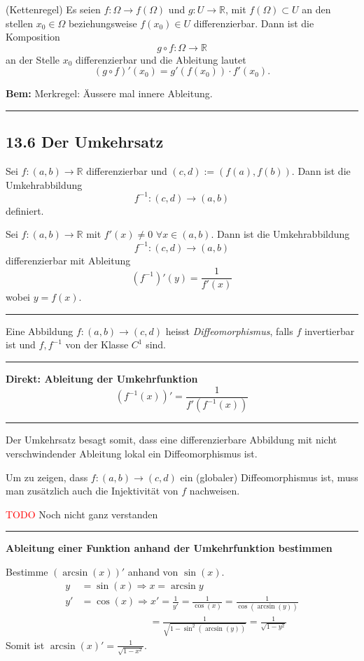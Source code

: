 \documentclass[a4paper,landscape,8pt]{extarticle}
\newcommand{\R}{\mathbb{R}}
\newcommand{\todo}{\textcolor{red}{TODO }}
\newcommand{\sep}{\vspace{5pt}\noindent\hrule\vspace{5pt}}
\newcommand{\Bem}{\textbf{Bem: }}
\begin{document}
\begin{multicols*}{4}
\Satz (Kettenregel) Es seien $f\colon\Omega\to f(\Omega)$ und $g\colon
U\to\R$, mit $f(\Omega) \subset U$ an den stellen $x_0\in \Omega$
beziehungsweise $f(x_0)\in U$ differenzierbar. Dann ist die Komposition
\[
g\circ f \colon \Omega \to \R
\]
an der Stelle $x_0$ differenzierbar und die Ableitung lautet
\[
(g\circ f)'(x_0) = g'(f(x_0))\cdot f'(x_0).
\]

\Bem Merkregel: Äussere mal innere Ableitung.

\sep

\subsection{13.6 Der Umkehrsatz}

Sei $f\colon (a,b)\to\R$ differenzierbar und $(c,d):=(f(a),f(b))$. Dann ist die
Umkehrabbildung
\[
f^{-1}\colon (c,d) \to (a,b)
\]
definiert.

\Satz Sei $f\colon (a,b)\to \R$ mit $f'(x)\neq 0$ $\forall x \in (a,b)$. Dann
ist die Umkehrabbildung
\[
f^{-1}\colon (c,d)\to (a,b)
\]
differenzierbar mit Ableitung
\[
(f^{-1})'(y)=\frac{1}{f'(x)}
\]
wobei $y=f(x)$.

\sep

\Def Eine Abbildung $f\colon (a,b)\to(c,d)$ heisst \emph{Diffeomorphismus},
falls $f$ invertierbar ist und $f,f^{-1}$ von der Klasse $C^1$ sind.

\sep

\textbf{Direkt: Ableitung der Umkehrfunktion}
\[
(f^{-1}(x))' = \frac{1}{f'\left(f^{-1}(x)\right)}
\]

\sep

Der Umkehrsatz besagt somit, dass eine differenzierbare Abbildung mit nicht
verschwindender Ableitung lokal ein Diffeomorphismus ist.

Um zu zeigen, dass $f\colon (a,b)\to(c,d)$ ein (globaler) Diffeomorphismus ist,
muss man zusätzlich auch die Injektivität von $f$ nachweisen.

\begin{warmup}
\todo Noch nicht ganz verstanden
\end{warmup}

\sep

\textbf{Ableitung einer Funktion anhand der Umkehrfunktion bestimmen}

\Bsp Bestimme $(\arcsin(x))'$ anhand von $\sin(x)$.
\begin{align*}
y&=\sin(x) \Longrightarrow x = \arcsin y\\
y'&=\cos(x)\Longrightarrow x'=
\frac{1}{y'}=\frac{1}{\cos(x)}=\frac{1}{\cos(\arcsin(y))}\\
&\qquad\qquad \qquad\quad= \tfrac{1}{\sqrt{1-\sin^2(\arcsin(y))}}
=\tfrac{1}{\sqrt{1-y^2}}
\end{align*}
Somit ist $\arcsin(x)'=\frac{1}{\sqrt{1-x^2}}$.


\end{multicols*}
\end{document}
